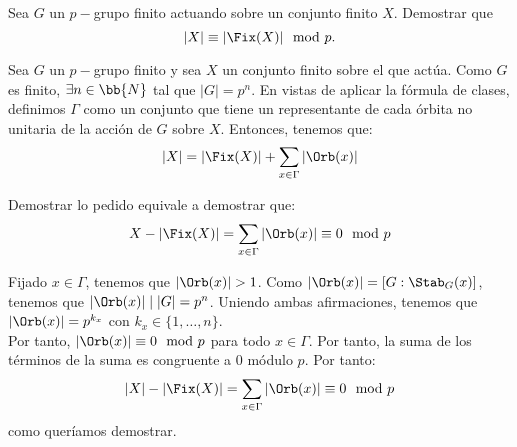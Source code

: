 \begin{ejercicio}\label{ej:6.12}
    Sea $G$ un $p-$grupo finito actuando sobre un conjunto finito $X$. Demostrar que
    \[
        |X| \equiv |\Fix(X)| \mod p.
    \]

    Sea $G$ un $p-$grupo finito y sea $X$ un conjunto finito sobre el que actúa. Como $G$ es finito, $\exists n\in \bb{N}$ tal que $|G|=p^n$.
    En vistas de aplicar la fórmula de clases, definimos $\Gamma$ como un conjunto que tiene un representante de cada órbita no unitaria de la acción de $G$ sobre $X$. Entonces, tenemos que:
    \begin{equation*}
        |X| = |\Fix(X)| + \sum_{x\in \Gamma} |\Orb(x)|
    \end{equation*}

    Demostrar lo pedido equivale a demostrar que:
    \begin{equation*}
        X-|\Fix(X)| = \sum_{x\in \Gamma} |\Orb(x)| \equiv 0 \mod p
    \end{equation*}

    Fijado $x\in \Gamma$, tenemos que $|\Orb(x)|>1$. Como $|\Orb(x)|=[G:\Stab_G(x)]$, tenemos que $|\Orb(x)|\mid |G|=p^n$. Uniendo ambas afirmaciones, tenemos que $|\Orb(x)|=p^{k_x}$ con $k_x\in \{1,\ldots,n\}$.\\

    Por tanto, $|\Orb(x)|\equiv 0 \mod p$ para todo $x\in \Gamma$. Por tanto, la suma de los términos de la suma es congruente a $0$ módulo $p$. Por tanto:
    \begin{equation*}
        |X| - |\Fix(X)| = \sum_{x\in \Gamma} |\Orb(x)| \equiv 0 \mod p
    \end{equation*}
    como queríamos demostrar.

\end{ejercicio}

